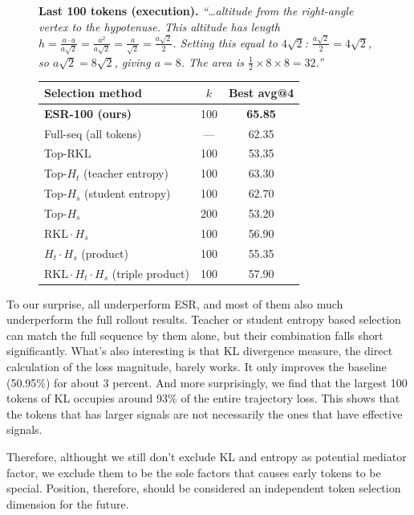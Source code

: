 \documentclass{article}
\newcommand{\method}{ESR}
\begin{document}
\begin{figure}[t]
\begin{minipage}[b]{0.50\textwidth}
{\begin{minipage}{0.93\linewidth}
    \smallskip
    \textbf{Last 100 tokens (execution).} \emph{``\dots altitude from the right-angle vertex to the hypotenuse. This altitude has length $h = \tfrac{a \cdot a}{a\sqrt{2}} = \tfrac{a^{2}}{a\sqrt{2}} = \tfrac{a}{\sqrt{2}} = \tfrac{a\sqrt{2}}{2}$. Setting this equal to $4\sqrt{2}$: $\tfrac{a\sqrt{2}}{2} = 4\sqrt{2}$, so $a\sqrt{2} = 8\sqrt{2}$, giving $a = 8$. The area is $\tfrac{1}{2}\times 8\times 8 = \boxed{32}$.''}
    \end{minipage}}
\end{minipage}
\hfill
\begin{minipage}[b]{0.46\textwidth}
    \centering
    \small
    \begin{tabular}{lcc}
    \toprule
    \textbf{Selection method} & \textbf{$k$} & \textbf{Best avg@4} \\
    \midrule
    \textbf{ESR-100 (ours)} & 100 & \textbf{65.85} \\
    Full-seq (all tokens) & --- & 62.35 \\
    \midrule
    Top-$\mathrm{RKL}$ & 100 & 53.35 \\
    Top-$H_t$ (teacher entropy) & 100 & 63.30 \\
    Top-$H_s$ (student entropy) & 100 & 62.70 \\
    Top-$H_s$ & 200 & 53.20 \\
    $\mathrm{RKL} \!\cdot\! H_s$ & 100 & 56.90 \\
    $H_t \!\cdot\! H_s$ (product) & 100 & 55.35 \\
    $\mathrm{RKL} \!\cdot\! H_t \!\cdot\! H_s$ (triple product) & 100 & 57.90 \\
    \bottomrule
    \end{tabular}
\end{minipage}
\end{figure}

 To our surprise, all underperform \method{}, and most of them also much underperform the full rollout results. Teacher or student entropy based selection can match the full sequence by them alone, but their combination falls short significantly. What's also interesting is that KL divergence measure, the direct calculation of the loss magnitude, barely works. It only improves the baseline (50.95\%) for about 3 percent. And more surprisingly, we find that the largest 100 tokens of KL occupies around 93\% of the entire trajectory loss. This shows that the tokens that has larger signals are not necessarily the ones that have effective signals. 
 
 Therefore, althought we still don't exclude KL and entropy as potential mediator factor, we exclude them to be the sole factors that causes early tokens to be special. Position, therefore, should be considered an independent token selection dimension for the future.
\end{document}
